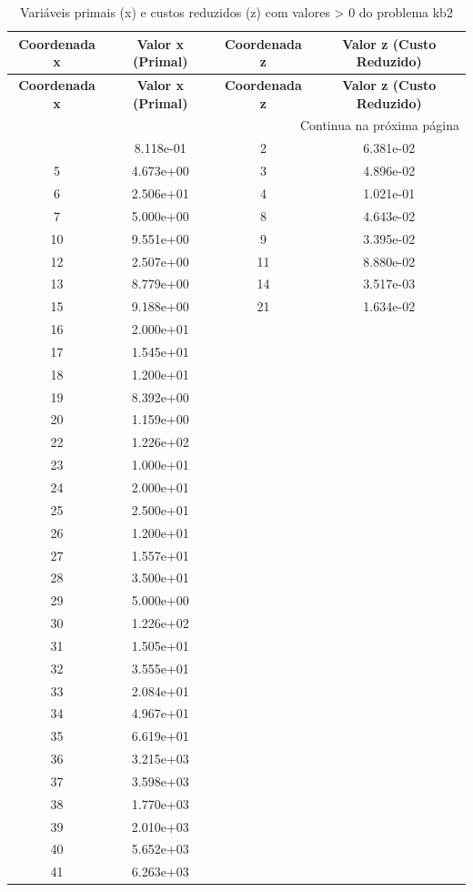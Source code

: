 \documentclass[12pt]{article}
\begin{document}
\begin{longtable}{@{}cccc@{}}
\caption{Variáveis primais (x) e custos reduzidos (z) com valores > 0 do problema kb2} \\
\toprule
\textbf{Coordenada x} & \textbf{Valor x (Primal)} & \textbf{Coordenada z} & \textbf{Valor z (Custo Reduzido)} \\
\midrule
\endfirsthead

\toprule
\textbf{Coordenada x} & \textbf{Valor x (Primal)} & \textbf{Coordenada z} & \textbf{Valor z (Custo Reduzido)} \\
\midrule
\endhead

\midrule \multicolumn{4}{r}{{Continua na próxima página}} \\ \midrule
\endfoot

\bottomrule
\endlastfoot
1 & 8.118e-01 & 2 & 6.381e-02 \\
5 & 4.673e+00 & 3 & 4.896e-02 \\
6 & 2.506e+01 & 4 & 1.021e-01 \\
7 & 5.000e+00 & 8 & 4.643e-02 \\
10 & 9.551e+00 & 9 & 3.395e-02 \\
12 & 2.507e+00 & 11 & 8.880e-02 \\
13 & 8.779e+00 & 14 & 3.517e-03 \\
15 & 9.188e+00 & 21 & 1.634e-02 \\
16 & 2.000e+01 &  &  \\
17 & 1.545e+01 &  &  \\
18 & 1.200e+01 &  &  \\
19 & 8.392e+00 &  &  \\
20 & 1.159e+00 &  &  \\
22 & 1.226e+02 &  &  \\
23 & 1.000e+01 &  &  \\
24 & 2.000e+01 &  &  \\
25 & 2.500e+01 &  &  \\
26 & 1.200e+01 &  &  \\
27 & 1.557e+01 &  &  \\
28 & 3.500e+01 &  &  \\
29 & 5.000e+00 &  &  \\
30 & 1.226e+02 &  &  \\
31 & 1.505e+01 &  &  \\
32 & 3.555e+01 &  &  \\
33 & 2.084e+01 &  &  \\
34 & 4.967e+01 &  &  \\
35 & 6.619e+01 &  &  \\
36 & 3.215e+03 &  &  \\
37 & 3.598e+03 &  &  \\
38 & 1.770e+03 &  &  \\
39 & 2.010e+03 &  &  \\
40 & 5.652e+03 &  &  \\
41 & 6.263e+03 &  &  \\

\bottomrule
\end{longtable}
\end{document}
